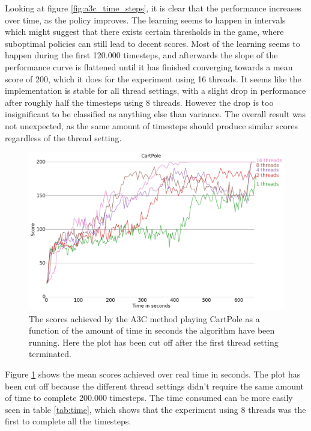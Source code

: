\documentclass[11pt]{article}
\begin{document}
Looking at figure \ref{fig:a3c_time_steps}, it is clear that the
performance increases over time, as the policy improves.
The learning seems to happen in intervals which might suggest
that there exists certain thresholds in the game, where
suboptimal policies can still lead to decent scores.
Most of the learning seems to happen during the first 120.000 timesteps,
and afterwards the slope of the performance curve
is flattened until it has finished converging towards a mean score
of 200, which it does for the experiment using 16 threads.
It seems like the implementation is stable for all thread settings, with a slight
drop in performance after roughly half the timesteps using 8 threads.
However the drop is too insignificant to be classified as anything else than variance.
The overall result was not unexpected, as the same amount of timesteps should produce similar
scores regardless of the thread setting. 

\begin{figure}[H]
    \centering
    \includegraphics[scale=0.4]{plots/cartpole_compare_time_without_AC.png}
    \caption{The scores achieved by the A3C method playing CartPole as a function
    of the amount of time in seconds the algorithm have been running.
    Here the plot has been cut off after the first thread setting
    terminated.}
    \label{fig:a3c_time}
\end{figure}

Figure \ref{fig:a3c_time} shows the mean scores achieved over real time in seconds.
The plot has been cut off because the different thread settings didn't require the
same amount of time to complete 200.000 timesteps.
The time consumed can be more easily seen in table \ref{tab:time}, which shows that
the experiment using 8 threads was the first to complete all the timesteps.
\end{document}
